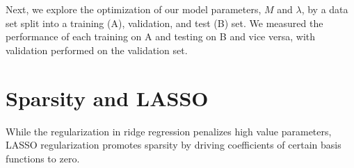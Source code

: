 \documentclass[10pt]{article}
\begin{document}

Next, we explore the optimization of our model parameters, $M$ and $\lambda$, by a data set split into a training (A), validation, and test (B) set. We measured the performance of each training on A and testing on B and vice versa, with validation performed on the validation set.








\section{Sparsity and LASSO}

While the regularization in ridge regression penalizes high value parameters, LASSO regularization promotes sparsity by driving coefficients of certain basis functions to zero.
\end{document}
